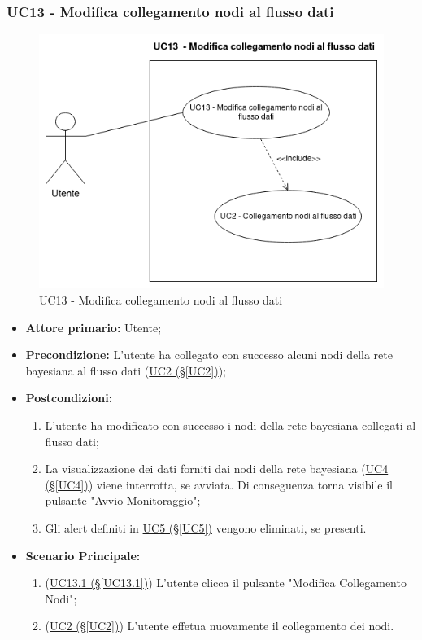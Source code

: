 \pagebreak

\subsubsection{UC13 - Modifica collegamento nodi al flusso dati}\label{UC13}

\begin{figure}[H]
\centering
\includegraphics[scale=0.6]{./images/UC13.png}
\caption{UC13 - Modifica collegamento nodi al flusso dati}
\end{figure}


\begin{itemize}
\item \textbf{Attore primario:} Utente;
\item \textbf{Precondizione:} L'utente ha collegato con successo alcuni nodi della rete bayesiana al flusso dati 			(\hyperref[UC2]{UC2 (§\ref*{UC2})});
\item \textbf{Postcondizioni:} 
	\begin{enumerate}
	\item L'utente ha modificato con successo i nodi della rete bayesiana collegati al flusso dati;
	\item La visualizzazione dei dati forniti dai nodi della rete bayesiana (\hyperref[UC4]{UC4 (§\ref*{UC4})}) viene 		interrotta, se avviata. Di conseguenza torna visibile il pulsante "Avvio Monitoraggio";
	\item Gli alert definiti in \hyperref[UC5]{UC5 (§\ref*{UC5})} vengono eliminati, se presenti.
	\end{enumerate}
\item \textbf{Scenario Principale:}
	\begin{enumerate}
	\item (\hyperref[UC13.1]{UC13.1 (§\ref*{UC13.1})}) L'utente clicca il pulsante "Modifica Collegamento Nodi";
	\item (\hyperref[UC2]{UC2 (§\ref*{UC2})}) L'utente effetua nuovamente il collegamento dei nodi.
	\end{enumerate}
\end{itemize}

